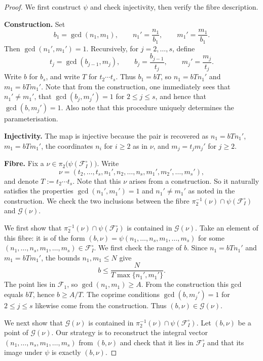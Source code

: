 \begin{proof}
We first construct $\psi$ and check injectivity, then verify the fibre description.

\smallskip\noindent\textbf{Construction.}
Set
\[
b_1=\gcd(n_1,m_1),\qquad
n_1'=\frac{n_1}{b_1},\qquad
m_1'=\frac{m_1}{b_1}.
\]
Then $\gcd(n_1',m_1')=1$. Recursively, for $j=2,\ldots,s$, define
\[
t_j=\gcd(b_{j-1},m_j),\qquad
b_j=\frac{b_{j-1}}{t_j},\qquad
m_j'=\frac{m_j}{t_j}.
\]
Write $b$ for $b_s$, and write $T$ for $t_2\cdots t_s$. Thus $b_1=bT$, so $n_1=bTn_1'$ and $m_1=bTm_1'$.
Note that from the construction, one immediately sees that $n_1'\neq m_1'$, that $\gcd(b_j,m_j')=1$ for $2\leq j\leq s$, and hence that $\gcd(b,m_j')=1$.
Also note that this procedure uniquely determines the parameterisation.

\smallskip\noindent\textbf{Injectivity.}
The map is injective because the pair is recovered as $n_1=bTn_1'$, $m_1=bTm_1'$, the coordinates $n_i$ for $i\geq 2$ as in $\nu$, and $m_j=t_jm_j'$ for $j\geq 2$.

\smallskip\noindent\textbf{Fibre.}
Fix a $\nu\in \pi_2\bigl(\psi(\mathscr{F}_I^\circ)\bigr)$. Write
\[
\nu=(t_2,\ldots,t_s,n_1',n_2,\ldots,n_s,m_1',m_2',\ldots,m_s'),
\]
and denote $T:=t_2\cdots t_s$.
Note that this $\nu$ arises from a construction.  So it naturally satisfies the properties $\gcd(n_1',m_1')=1$ and $n_1'\neq m_1'$ as noted in the construction.
We check the two inclusions between the fibre $\pi_2^{-1}(\nu)\cap\psi(\mathscr{F}_I^\circ)$ and $\mathscr G(\nu)$.

We first show that $\pi_2^{-1}(\nu)\cap\psi(\mathscr{F}_I^\circ)$ is contained in $\mathscr G(\nu)$.
Take an element of this fibre: it is of the form $(b,\nu)=\psi(n_1,\ldots,n_s,m_1,\ldots,m_s)$ for some $(n_1,\ldots,n_s,m_1,\ldots,m_s)\in\mathscr{F}_I^\circ$.
We first check the range of $b$.
Since $n_1=bTn_1'$ and $m_1=bTm_1'$, the bounds $n_1,m_1\leq N$ give
\[
b\leq\frac{N}{T\max\{n_1',m_1'\}}.
\]
The point lies in $\mathscr F_1$, so $\gcd(n_1,m_1)\geq A$.
From the construction this gcd equals $bT$, hence $b\geq A/T$.
The coprime conditions $\gcd(b,m_j')=1$ for $2\leq j\leq s$ likewise come from the construction.
Thus $(b,\nu)\in\mathscr G(\nu)$.

We next show that $\mathscr G(\nu)$ is contained in $\pi_2^{-1}(\nu)\cap\psi(\mathscr{F}_I^\circ)$.
Let $(b,\nu)$ be a point of $\mathscr G(\nu)$.
Our strategy is to reconstruct the integral vector $(n_1,\ldots,n_s,m_1,\ldots,m_s)$ from $(b,\nu)$ and check that it lies in $\mathscr{F}_I^\circ$ and that its image under $\psi$ is exactly $(b,\nu)$.


\end{proof}
